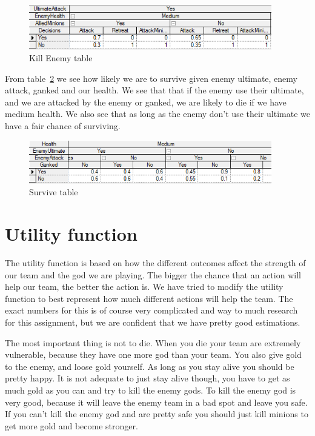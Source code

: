 \documentclass[titlepage]{article}
\begin{document}
\begin{figure}[H]
\includegraphics[width=400px]{KillEnemy.PNG}
\caption{Kill Enemy table}
\label{fig:KillEnemy}
\end{figure}

From table~\ref{fig:Survive} we see how likely we are to survive given enemy ultimate, enemy attack, ganked and our health.
We see that that if the enemy use their ultimate, and we are attacked by the enemy or ganked, we are likely to die if we have medium health. We also see that as long as the enemy don't use their ultimate we have a fair chance of surviving.

\begin{figure}[H]
\includegraphics[width=400px]{SurviveTable.PNG}
\caption{Survive table}
\label{fig:Survive}
\end{figure}

\section{Utility function}The utility function is based on how the different outcomes affect the strength of our team and the god we are playing. The bigger the chance that an action will help our team, the better the action is. We have tried to modify the utility function to best represent how much different actions will help the team. The exact numbers for this is of course very complicated and way to much research for this assignment, but we are confident that we have pretty good estimations. 

The most important thing is not to die. When you die your team are extremely vulnerable, because they have one more god than your team. You also give gold to the enemy, and loose gold yourself. As long as you stay alive you should be pretty happy. It is not adequate to just stay alive though, you have to get as much gold as you can and try to kill the enemy gods. To kill the enemy god is very good, because it will leave the enemy team in a bad spot and leave you safe. If you can't kill the enemy god and are pretty safe you should just kill minions to get more gold and become stronger.
\end{document}
